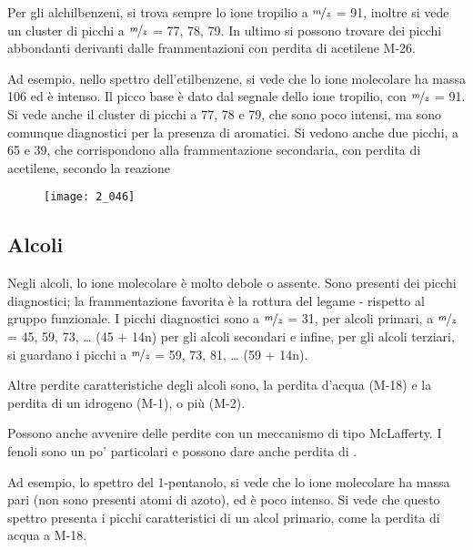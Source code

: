 Per gli alchilbenzeni, si trova sempre lo ione tropilio a $\nicefrac{m}{z}$ = 91,
inoltre si vede un cluster di picchi a $\nicefrac{m}{z}$ = 77, 78, 79. In ultimo si
possono trovare dei picchi abbondanti derivanti dalle frammentazioni con
perdita di acetilene M-26.

\pagebreak

Ad esempio, nello spettro dell'etilbenzene, si vede che lo ione
molecolare ha massa 106 ed è intenso. Il picco base è dato dal segnale
dello ione tropilio, con $\nicefrac{m}{z}$ = 91. Si vede anche il cluster di picchi a
77, 78 e 79, che sono poco intensi, ma sono comunque diagnostici per la
presenza di aromatici. Si vedono anche due picchi, a 65 e 39, che corrispondono alla
frammentazione secondaria, con perdita di acetilene, secondo la reazione

\begin{figure}[H]
  \texttt{[image: 2\_046]}
\end{figure}


\subsection{Alcoli}

Negli alcoli, lo ione molecolare è molto debole o assente. Sono presenti
dei picchi diagnostici; la frammentazione favorita è la rottura del
legame \alpha-\beta{} rispetto al gruppo funzionale. I picchi
diagnostici sono a $\nicefrac{m}{z}$ = 31, per alcoli primari, a $\nicefrac{m}{z}$ = 45, 59, 73,
\ldots{} (45 + 14n) per gli alcoli secondari e infine, per gli alcoli
terziari, si guardano i picchi a $\nicefrac{m}{z}$ = 59, 73, 81, \ldots{} (59 + 14n).

Altre perdite caratteristiche degli alcoli sono, la perdita d'acqua
(M-18) e la perdita di un idrogeno (M-1), o più (M-2).

Possono anche avvenire delle perdite con un meccanismo di tipo
McLafferty. I fenoli sono un po' particolari e possono dare anche
perdita di .

\vfill

\pagebreak


Ad esempio, lo spettro del 1-pentanolo, si vede che lo ione molecolare
ha massa pari (non sono presenti atomi di azoto), ed è poco intenso. Si
vede che questo spettro presenta i picchi caratteristici di un alcol
primario, come la perdita di acqua a M-18.

